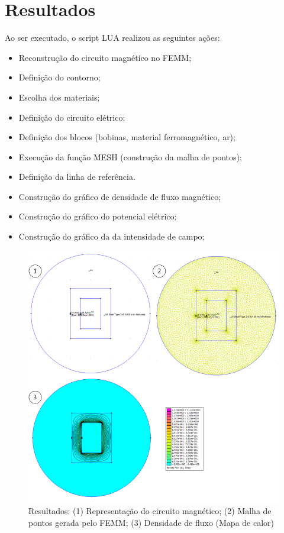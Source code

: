 \section{Resultados}
Ao ser executado, o script LUA realizou as seguintes ações:
\begin{itemize}
\item Reconstrução do circuito magnético no FEMM;
\item Definição do contorno;
\item Escolha dos materiais;
\item Definição do circuito elétrico;
\item Definição dos blocos (bobinas, material ferromagnético, ar);
\item Execução da função MESH (construção da malha de pontos);
\item Definição da linha de referência.
\item Construção do gráfico de densidade de fluxo magnético;
\item Construção do gráfico do potencial elétrico;
\item Construção do gráfico da da intensidade de campo;
\end{itemize}

\begin{figure}[H]
\centering
\includegraphics[scale=0.7]{img/assig2/results_1.png}
\caption[Resultados]{Resultados: (1) Representação do circuito magnético; (2) Malha de pontos gerada pelo FEMM; (3) Densidade de fluxo (Mapa de calor)}
\label{lua_mesh}
\end{figure}

